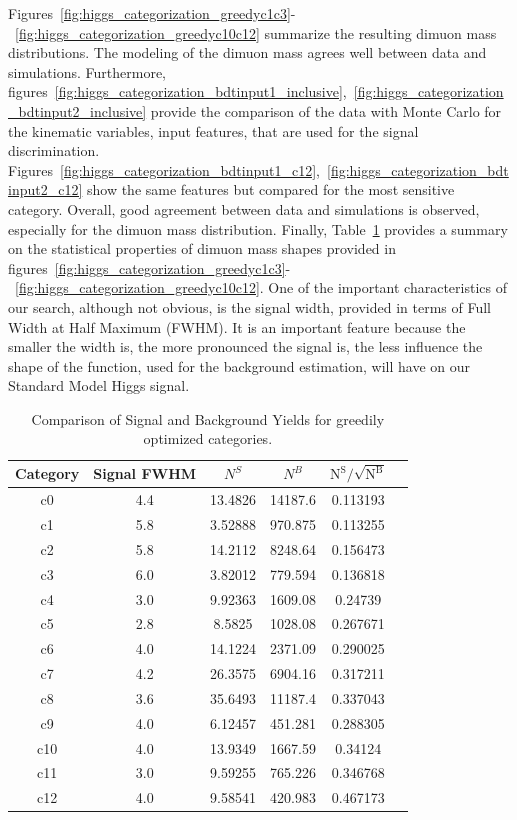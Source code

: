 Figures~\ref{fig:higgs_categorization_greedyc1c3}-~\ref{fig:higgs_categorization_greedyc10c12} summarize the resulting dimuon mass distributions. The modeling of the dimuon mass agrees well between data and simulations. Furthermore, figures~\ref{fig:higgs_categorization_bdtinput1_inclusive},~\ref{fig:higgs_categorization_bdtinput2_inclusive} provide the comparison of the data with Monte Carlo for the kinematic variables, input features, that are used for the signal discrimination. Figures~\ref{fig:higgs_categorization_bdtinput1_c12},~\ref{fig:higgs_categorization_bdtinput2_c12} show the same features but compared for the most sensitive category. Overall, good agreement between data and simulations is observed, especially for the dimuon mass distribution. Finally, Table~\ref{tab:higgs_categorization_yields} provides a summary on the statistical properties of dimuon mass shapes provided in figures~\ref{fig:higgs_categorization_greedyc1c3}-~\ref{fig:higgs_categorization_greedyc10c12}. One of the important characteristics of our search, although not obvious, is the signal width, provided in terms of Full Width at Half Maximum (FWHM). It is an important feature because the smaller the width is, the more pronounced the signal is, the less influence the shape of the function, used for the background estimation, will have on our Standard Model Higgs signal.
\begin{table}[htb]
  \caption{Comparison of Signal and Background Yields for greedily optimized categories.}
  \label{tab:higgs_categorization_yields}
  \begin{center}
    \begin{tabular}{|c|c|c|c|c|c|}
      \hline
      Category  & Signal FWHM & $N^{S}$ & $N^{B}$ & $\mathrm{N^S / \sqrt{N^B}}$ \\
      \hline
      c0 & 4.4 & 13.4826 & 14187.6 & 0.113193\\
      c1 & 5.8 & 3.52888 & 970.875 & 0.113255\\
      c2 & 5.8 & 14.2112 & 8248.64 & 0.156473\\
      c3 & 6.0 & 3.82012 & 779.594 & 0.136818\\
      c4 & 3.0 & 9.92363 & 1609.08 & 0.24739\\
      c5 & 2.8 & 8.5825  & 1028.08 & 0.267671\\
      c6 & 4.0 & 14.1224 & 2371.09 & 0.290025\\
      c7 & 4.2 & 26.3575 & 6904.16 & 0.317211\\
      c8 & 3.6 & 35.6493 & 11187.4 & 0.337043\\
      c9 & 4.0 & 6.12457 & 451.281 & 0.288305\\
      c10 & 4.0 & 13.9349 & 1667.59 & 0.34124\\
      c11 & 3.0 & 9.59255 & 765.226 & 0.346768\\
      c12 & 4.0 & 9.58541 & 420.983 & 0.467173\\
      \hline
    \end{tabular}
  \end{center}
\end{table}
